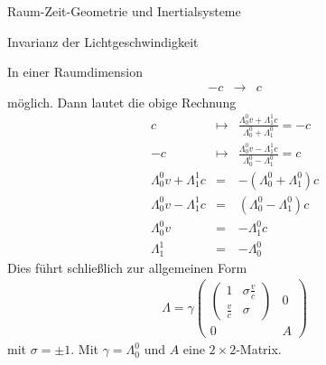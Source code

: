 \begin{chapter}{\titlestr}
\begin{section}{Raum-Zeit-Geometrie und Inertialsysteme}
\begin{subsection}{Invarianz der Lichtgeschwindigkeit}
\begin{subsubsection}{In einer Raumdimension}
\begin{eqnarray*}
-c &\rightarrow& c
\end{eqnarray*}
möglich. Dann lautet die obige Rechnung
\begin{eqnarray*}
c &\mapsto& \frac{\Lambda^0_0v +\Lambda^1_1c}{\Lambda^0_0+\Lambda^0_1}=-c\\
-c &\mapsto& \frac{\Lambda^0_0v -\Lambda^1_1c}{\Lambda^0_0-\Lambda^0_1}=c\\
\Lambda^0_0v +\Lambda^1_1c &=& -\left(\Lambda^0_0+\Lambda^0_1\right)c\\
\Lambda^0_0v -\Lambda^1_1c &=& \left(\Lambda^0_0-\Lambda^0_1\right)c\\
\Lambda^0_0v &=&  -\Lambda^0_1c\\
\Lambda^1_1 &=& -\Lambda^0_0
\end{eqnarray*}
Dies führt schließlich zur allgemeinen Form
\begin{eqnarray*}
\Lambda =
\gamma
\begin{pmatrix}
\begin{pmatrix}
1 & \sigma\frac{v}{c}\\
\frac{v}{c} & \sigma
\end{pmatrix} & 0\\
0 & A
\end{pmatrix}
\end{eqnarray*}
mit $\sigma=\pm 1$.
Mit $\gamma=\Lambda^0_0$ und $A$ eine $2\times 2$-Matrix.
\end{subsubsection}


\end{subsection}
\end{section}
\end{chapter}
